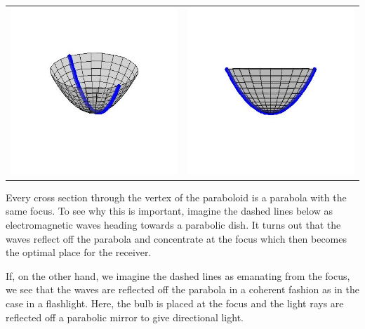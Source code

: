 \documentclass{ximera}
\begin{document}
\begin{center}

\begin{tabular}{cc}

\includegraphics[width=2.5in]{./ParabolasGraphics/Paraboloid01.jpg} & \includegraphics[width=2.5in]{./ParabolasGraphics/Paraboloid02.jpg} \\

\end{tabular}

\end{center}

Every cross section through the vertex of the paraboloid is a parabola with the same focus.  To see why this is important, imagine the dashed lines below as electromagnetic waves heading towards a parabolic dish.   It turns out that the waves reflect off the parabola and concentrate at the focus which then becomes the optimal place for the receiver. 

\smallskip

If, on the other hand, we imagine the dashed lines as emanating from the focus, we see that the waves are reflected off the parabola in a coherent fashion as in the case in a flashlight.  Here, the bulb is placed at the focus and the light rays are reflected off a parabolic mirror to give directional light.
\end{document}
